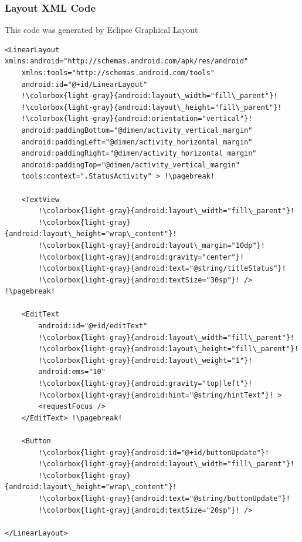 \begin{frame}
\frametitle{Layout XML Code}
This code was generated by Eclipse Graphical Layout
\lstset{language=XML, style=eclipse}
\begin{lstlisting}[caption=res/layout/activity\_status.xml, basicstyle=\scriptsize,escapechar=!]
<LinearLayout xmlns:android="http://schemas.android.com/apk/res/android"
    xmlns:tools="http://schemas.android.com/tools"
    android:id="@+id/LinearLayout"
    !\colorbox{light-gray}{android:layout\_width="fill\_parent"}!
    !\colorbox{light-gray}{android:layout\_height="fill\_parent"}!
    !\colorbox{light-gray}{android:orientation="vertical"}!
    android:paddingBottom="@dimen/activity_vertical_margin"
    android:paddingLeft="@dimen/activity_horizontal_margin"
    android:paddingRight="@dimen/activity_horizontal_margin"
    android:paddingTop="@dimen/activity_vertical_margin"
    tools:context=".StatusActivity" > !\pagebreak!

    <TextView
        !\colorbox{light-gray}{android:layout\_width="fill\_parent"}!
        !\colorbox{light-gray}{android:layout\_height="wrap\_content"}!
        !\colorbox{light-gray}{android:layout\_margin="10dp"}!
        !\colorbox{light-gray}{android:gravity="center"}!
        !\colorbox{light-gray}{android:text="@string/titleStatus"}!
        !\colorbox{light-gray}{android:textSize="30sp"}! /> !\pagebreak!

    <EditText
        android:id="@+id/editText"
        !\colorbox{light-gray}{android:layout\_width="fill\_parent"}!
        !\colorbox{light-gray}{android:layout\_height="fill\_parent"}!
        !\colorbox{light-gray}{android:layout\_weight="1"}!
        android:ems="10"
        !\colorbox{light-gray}{android:gravity="top|left"}!
        !\colorbox{light-gray}{android:hint="@string/hintText"}! >
        <requestFocus />
    </EditText> !\pagebreak!

    <Button
        !\colorbox{light-gray}{android:id="@+id/buttonUpdate"}!
        !\colorbox{light-gray}{android:layout\_width="fill\_parent"}!
        !\colorbox{light-gray}{android:layout\_height="wrap\_content"}!
        !\colorbox{light-gray}{android:text="@string/buttonUpdate"}!
        !\colorbox{light-gray}{android:textSize="20sp"}! />

</LinearLayout>
\end{lstlisting}
\end{frame}
